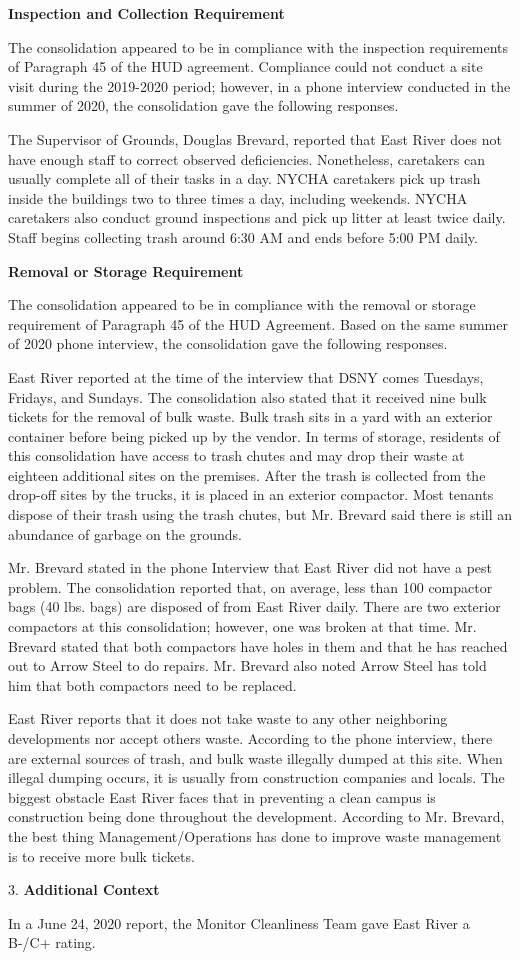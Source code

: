 
\textbf{Inspection and Collection Requirement}

The consolidation appeared to be in compliance with the inspection requirements of Paragraph 45 of the HUD agreement. Compliance could not conduct a site visit during the 2019-2020 period; however, in a phone interview conducted in the summer of 2020, the consolidation gave the following responses.

The Supervisor of Grounds, Douglas Brevard, reported that East River does not have enough staff to correct observed deficiencies. Nonetheless, caretakers can usually complete all of their tasks in a day. NYCHA caretakers pick up trash inside the buildings two to three times a day, including weekends. NYCHA caretakers also conduct ground inspections and pick up litter at least twice daily. Staff begins collecting trash around 6:30 AM and ends before 5:00 PM daily.

\textbf{Removal or Storage Requirement}

The consolidation appeared to be in compliance with the removal or storage requirement of Paragraph  45 of the HUD Agreement. Based on the same summer of  2020 phone interview, the consolidation gave the following responses.

East River reported at the time of the interview that DSNY comes Tuesdays, Fridays, and Sundays. The consolidation also stated that it received nine bulk tickets for the removal of bulk waste. Bulk trash sits in a yard with an exterior container before being picked up by the vendor. In terms of storage, residents of this consolidation have access to trash chutes and may drop their waste at eighteen additional sites on the premises. After the trash is collected from the drop-off sites by the trucks, it is placed in an exterior compactor. Most tenants dispose of their trash using the trash chutes, but Mr. Brevard said there is still an abundance of garbage on the grounds. 

Mr. Brevard stated in the phone Interview that East River did not have a pest problem. The consolidation reported that, on average, less than 100 compactor bags (40 lbs. bags) are disposed of from East River daily. There are two exterior compactors at this consolidation; however, one was broken at that time.  Mr. Brevard stated that both compactors have holes in them and that he has reached out to Arrow Steel to do repairs. Mr. Brevard also noted Arrow Steel has told him that both compactors need to be replaced. 

East River reports that it does not take waste to any other neighboring developments nor accept others waste. According to the phone interview, there are external sources of trash, and bulk waste illegally dumped at this site. When illegal dumping occurs, it is usually from construction companies and locals. The biggest obstacle East River faces that in preventing a clean campus is construction being done throughout the development. According to Mr. Brevard, the best thing Management/Operations has done to improve waste management is to receive more bulk tickets.  

3. \textbf{Additional Context}

In a June 24, 2020 report, the Monitor Cleanliness Team gave East River a B-/C+ rating. 